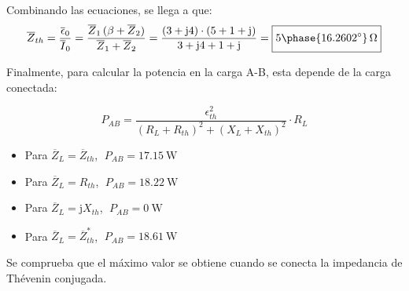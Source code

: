 \begin{example}
Combinando las ecuaciones, se llega a que:
\begin{equation*}
  \overline{Z}_{th} = \dfrac{\overline{\epsilon}_0}{\overline{I}_0} = \dfrac{\overline{Z}_1\,(\beta + \overline{Z}_2)}{\overline{Z}_1+\overline{Z}_2}=\dfrac{(3+\mathrm{j}4)\cdot (5+1+\mathrm{j})}{3+\mathrm{j}4+1+\mathrm{j}} = \boxed{\vphantom{\frac{a}{a}} 5\phase{16.2602^\circ}\,\Omega}
\end{equation*}

Finalmente, para calcular la potencia en la carga A-B, esta depende de
la carga conectada:

\begin{equation*}
  P_{AB} = \dfrac{\epsilon_{th}^2}{{(R_L+R_{th})^2+(X_L+X_{th})^2}} \cdot R_L
\end{equation*}

\begin{itemize}
\item Para $\overline{Z}_L = \overline{Z}_{th}$,
  $\;P_{AB} = \qty{17.15}{\watt}$
\item Para $\overline{Z}_L = R_{th}$, $\;P_{AB} = \qty{18.22}{\watt}$
\item Para $\overline{Z}_L = \mathrm{j}X_{th}$,
  $\;P_{AB} = \qty{0}{\watt}$
\item Para $\overline{Z}_L = \overline{Z}_{th}^*$,
  $\;P_{AB} = \qty{18.61}{\watt}$
\end{itemize}

Se comprueba que el máximo valor se obtiene cuando se conecta la
impedancia de Thévenin conjugada.

\end{example}
	

